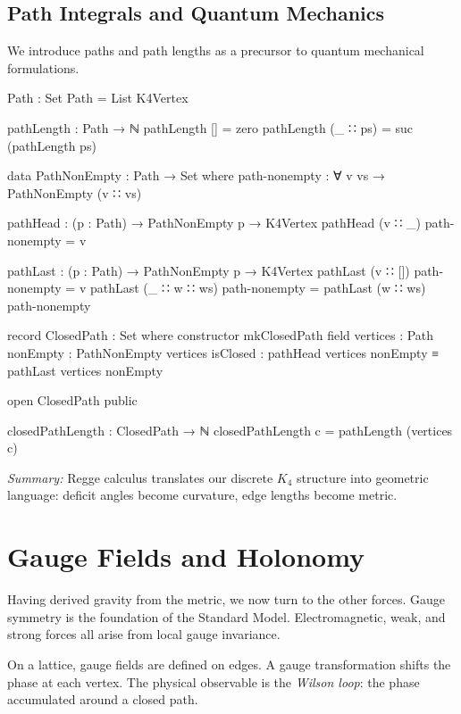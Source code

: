\documentclass[11pt,a4paper]{book}
\begin{document}
\section{Path Integrals and Quantum Mechanics}

We introduce paths and path lengths as a precursor to quantum mechanical formulations.

\begin{code}
Path : Set
Path = List K4Vertex

pathLength : Path → ℕ
pathLength [] = zero
pathLength (_ ∷ ps) = suc (pathLength ps)

data PathNonEmpty : Path → Set where
  path-nonempty : ∀ {v vs} → PathNonEmpty (v ∷ vs)

pathHead : (p : Path) → PathNonEmpty p → K4Vertex
pathHead (v ∷ _) path-nonempty = v

pathLast : (p : Path) → PathNonEmpty p → K4Vertex
pathLast (v ∷ []) path-nonempty = v
pathLast (_ ∷ w ∷ ws) path-nonempty = pathLast (w ∷ ws) path-nonempty

record ClosedPath : Set where
  constructor mkClosedPath
  field
    vertices  : Path
    nonEmpty  : PathNonEmpty vertices
    isClosed  : pathHead vertices nonEmpty ≡ pathLast vertices nonEmpty

open ClosedPath public

closedPathLength : ClosedPath → ℕ
closedPathLength c = pathLength (vertices c)
\end{code}

\medskip
\noindent\textit{Summary:} Regge calculus translates our discrete $K_4$ structure into 
geometric language: deficit angles become curvature, edge lengths become metric.

\chapter{Gauge Fields and Holonomy}

Having derived gravity from the metric, we now turn to the other forces. Gauge symmetry 
is the foundation of the Standard Model. Electromagnetic, weak, and strong forces all 
arise from local gauge invariance.

On a lattice, gauge fields are defined on edges. A gauge transformation shifts the phase 
at each vertex. The physical observable is the \emph{Wilson loop}: the phase accumulated 
around a closed path.
\end{document}
